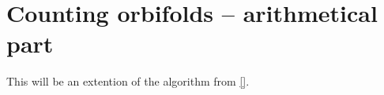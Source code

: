 \chapter{Counting orbifolds -- arithmetical part}\label{Counting orbifolds -- arithmetical part}






This will be an extention of the algorithm from \ref{}. 

